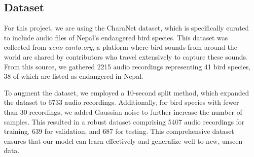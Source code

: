 \subsection{Dataset}

For this project, we are using the CharaNet dataset, which is specifically curated to include audio files of Nepal's endangered bird species. This dataset was collected from \textit{xeno-canto.org}, a platform where bird sounds from around the world are shared by contributors who travel extensively to capture these sounds. From this source, we gathered 2215 audio recordings representing 41 bird species, 38 of which are listed as endangered in Nepal.

To augment the dataset, we employed a 10-second split method, which expanded the dataset to 6733 audio recordings. Additionally, for bird species with fewer than 30 recordings, we added Gaussian noise to further increase the number of samples. This resulted in a robust dataset comprising 5407 audio recordings for training, 639 for validation, and 687 for testing. This comprehensive dataset ensures that our model can learn effectively and generalize well to new, unseen data.\\
\newpage
